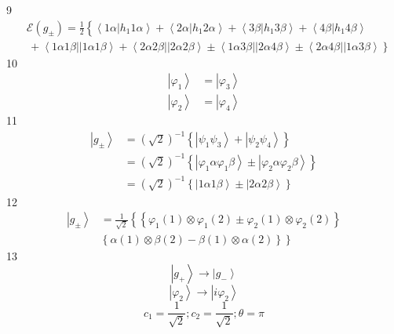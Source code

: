 \documentclass[aps,preprint]{revtex4}%
\begin{document}
9%
\begin{align*}
&  \mathcal{E}\left(  g_{\pm}\right)  =\frac{1}{2}\left\{  \overset
{}{\left\langle 1\alpha\left\vert h_{1}1\alpha\right.  \right\rangle
+\left\langle 2\alpha\left\vert h_{1}2\alpha\right.  \right\rangle
+\left\langle 3\beta\left\vert h_{1}3\beta\right.  \right\rangle +\left\langle
4\beta\left\vert h_{1}4\beta\right.  \right\rangle }\right. \\
&  \left.  \,+\left\langle 1\alpha1\beta\right\vert \left\vert 1\alpha
1\beta\right\rangle +\left\langle 2\alpha2\beta\right\vert \left\vert
2\alpha2\beta\right\rangle \pm\left\langle 1\alpha3\beta\right\vert \left\vert
2\alpha4\beta\right\rangle \pm\left\langle 2\alpha4\beta\right\vert \left\vert
1\alpha3\beta\right\rangle \overset{}{}\right\}
\end{align*}
10%
\begin{align*}
\left\vert \varphi_{1}\right\rangle  &  =\left\vert \varphi_{3}\right\rangle
\\
\left\vert \varphi_{2}\right\rangle  &  =\left\vert \varphi_{4}\right\rangle
\end{align*}
11%
\begin{align*}
\left\vert g_{\pm}\right\rangle  &  =\left(  \sqrt{2}\right)  ^{-1}\left\{
\left\vert \psi_{1}\psi_{3}\right\rangle +\left\vert \psi_{2}\psi
_{4}\right\rangle \right\} \\
&  =\left(  \sqrt{2}\right)  ^{-1}\left\{  \left\vert \varphi_{1}\alpha
\varphi_{1}\beta\right\rangle \pm\left\vert \varphi_{2}\alpha\varphi_{2}%
\beta\right\rangle \right\} \\
&  =\left(  \sqrt{2}\right)  ^{-1}\left\{  \left\vert 1\alpha1\beta
\right\rangle \pm\left\vert 2\alpha2\beta\right\rangle \right\}
\end{align*}
12%
\begin{align*}
\left\vert g_{\pm}\right\rangle  &  =\frac{1}{\sqrt{2}}\left\{  \overset{}%
{}\left\{  \varphi_{1}\left(  1\right)  \otimes\varphi_{1}\left(  2\right)
\pm\varphi_{2}\left(  1\right)  \otimes\varphi_{2}\left(  2\right)  \right\}
\right. \\
&  \left.  \left\{  \alpha\left(  1\right)  \otimes\beta\left(  2\right)
-\beta\left(  1\right)  \otimes\alpha\left(  2\right)  \right\}  \overset{}%
{}\right\}
\end{align*}
13%
\[
\left\vert g_{+}\right\rangle \rightarrow\left\vert g_{-}\right\rangle
\]%
\[
\left\vert \varphi_{2}\right\rangle \rightarrow\left\vert i\varphi
_{2}\right\rangle
\]%
\[
c_{1}=\frac{1}{\sqrt{2}};c_{2}=\frac{1}{\sqrt{2}};\theta=\pi
\]
\end{document}
